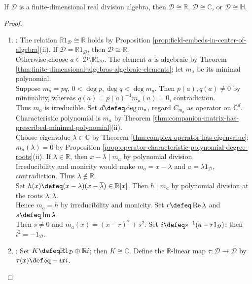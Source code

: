 \begin{theorem} \label{thm:frobenius-real-division-algebras} \\
If $\mathcal{D}$ is a finite-dimensional real division algebra, then $\mathcal{D}\cong\mathbb{R}$, $\mathcal{D}\cong\mathbb{C}$, or $\mathcal{D}\cong\mathbb{H}$.
\begin{proof}
\begin{enumerate}[label=(\roman*)]
\setlength{\itemsep}{0pt}
\item {}: The relation $\mathbb{R}1_{\mathcal{D}}\cong\mathbb{R}$ holds by Proposition \ref{prop:field-embeds-in-center-of-algebra}(ii). If $\mathcal{D}=\mathbb{R}1_{\mathcal{D}}$, then $\mathcal{D}\cong\mathbb{R}$.\\
Otherwise choose $a\in\mathcal{D}\setminus\mathbb{R}1_{\mathcal{D}}$. The element $a$ is algebraic by Theorem \ref{thm:finite-dimensional-algebras-algebraic-elements}; let $m_a$ be its minimal polynomial.\\
Suppose $m_a=pq$, $0<\deg p,\deg q<\deg m_a$. Then $p(a),q(a)\neq0$ by minimality, whereas $q(a)=p(a)^{-1}m_a(a)=0$, contradiction.\\
Thus $m_a$ is irreducible. Set $d\defeq\deg m_a$, regard $C_{m_a}$ as operator on $\mathbb{C}^d$. Characteristic polynomial is $m_a$ by Theorem \ref{thm:companion-matrix-has-prescribed-minimal-polynomial}(ii).\\
Choose eigenvalue $\lambda\in\mathbb{C}$ by Theorem \ref{thm:complex-operator-has-eigenvalue}; $m_a(\lambda)=0$ by Proposition \ref{prop:operator-characteristic-polynomial-degree-roots}(ii). If $\lambda\in\mathbb{R}$, then $x-\lambda\mid m_a$ by polynomial division.\\
Irreducibility and monicity would make $m_a=x-\lambda$ and $a=\lambda1_{\mathcal{D}}$, contradiction. Thus $\lambda\notin\mathbb{R}$.\\
Set $h(x)\defeq(x-\lambda)(x-\overline{\lambda})\in\mathbb{R}[x]$. Then $h\mid m_a$ by polynomial division at the roots $\lambda,\overline{\lambda}$.\\
Hence $m_a=h$ by irreducibility and monicity. Set $r\defeq\operatorname{Re}\lambda$ and $s\defeq\operatorname{Im}\lambda$.\\
Then $s\neq0$ and $m_a(x)=(x-r)^2+s^2$. Set $i\defeq s^{-1}(a-r1_{\mathcal{D}})$; then $i^2=-1_{\mathcal{D}}$.
\item {}: Set $K\defeq\mathbb{R}1_{\mathcal{D}}\oplus\mathbb{R}i$; then $K\cong\mathbb{C}$. Define the $\mathbb{R}$-linear map $\tau:\mathcal{D}\to\mathcal{D}$ by $\tau(x)\defeq-ixi$.\\

\end{enumerate}
\end{proof}
\end{theorem}
